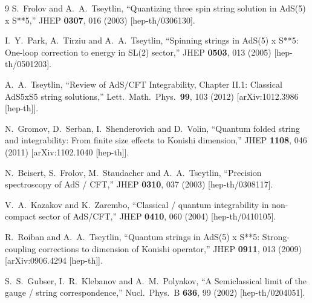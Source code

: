 \documentclass[a4paper,11pt]{article}
\numberwithin{equation}{section}
\begin{document}
\begin{thebibliography} {9}
  S.~Frolov and A.~A.~Tseytlin,
  ``Quantizing three spin string solution in AdS(5) x S**5,''
  JHEP {\bf 0307}, 016 (2003)
  [hep-th/0306130].

  I.~Y.~Park, A.~Tirziu and A.~A.~Tseytlin,
  ``Spinning strings in AdS(5) x S**5: One-loop correction to energy in SL(2) sector,''
  JHEP {\bf 0503}, 013 (2005)
  [hep-th/0501203].

  A.~A.~Tseytlin,
  ``Review of AdS/CFT Integrability, Chapter II.1: Classical AdS5xS5 string solutions,''
  Lett.\ Math.\ Phys.\  {\bf 99}, 103 (2012)
  [arXiv:1012.3986 [hep-th]].

  N.~Gromov, D.~Serban, I.~Shenderovich and D.~Volin,
  ``Quantum folded string and integrability: From finite size effects to Konishi dimension,''
  JHEP {\bf 1108}, 046 (2011)
  [arXiv:1102.1040 [hep-th]].

  N.~Beisert, S.~Frolov, M.~Staudacher and A.~A.~Tseytlin,
  ``Precision spectroscopy of AdS / CFT,''
  JHEP {\bf 0310}, 037 (2003)
  [hep-th/0308117].

  V.~A.~Kazakov and K.~Zarembo,
  ``Classical / quantum integrability in non-compact sector of AdS/CFT,''
  JHEP {\bf 0410}, 060 (2004)
  [hep-th/0410105].

  R.~Roiban and A.~A.~Tseytlin,
  ``Quantum strings in AdS(5) x S**5: Strong-coupling corrections to dimension of Konishi operator,''
  JHEP {\bf 0911}, 013 (2009)
  [arXiv:0906.4294 [hep-th]].

  S.~S.~Gubser, I.~R.~Klebanov and A.~M.~Polyakov,
  ``A Semiclassical limit of the gauge / string correspondence,''
  Nucl.\ Phys.\ B {\bf 636}, 99 (2002)
  [hep-th/0204051].


\end{thebibliography}
\end{document}
